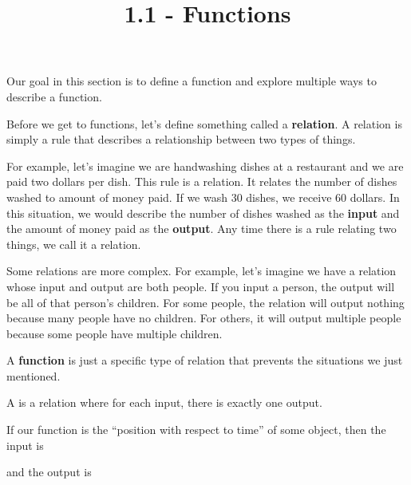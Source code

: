\documentclass{ximera}
\title{1.1 - Functions}
\begin{document}
\begin{abstract}
  
\end{abstract}

\maketitle

Our goal in this section is to define a function and explore multiple ways to describe a function.

Before we get to functions, let's define something called a \textbf{relation}. A relation is simply a rule that describes a relationship between two types of things.

For example, let's imagine we are handwashing dishes at a restaurant and we are paid two dollars per dish. This rule is a relation. It relates the number of dishes washed to amount of money paid. If we wash 30 dishes, we receive 60 dollars. In this situation, we would describe the number of dishes washed as the \textbf{input} and the amount of money paid as the \textbf{output}. Any time there is a rule relating two things, we call it a relation.

Some relations are more complex. For example, let's imagine we have a relation whose input and output are both people. If you input a person, the output will be all of that person's children. For some people, the relation will output nothing because many people have no children. For others, it will output multiple people because some people have multiple children. 

A \textbf{function} is just a specific type of relation that prevents the situations we just mentioned.

\begin{definition}
A  is a relation where for each input,
there is exactly one output.
\end{definition}

\begin{question}
  If our function is the ``position with respect to time'' of some
  object, then the input is
  \begin{multipleChoice}
  \end{multipleChoice}
  and the output is
  \begin{multipleChoice}
  \end{multipleChoice}
\end{question}
\end{document}
